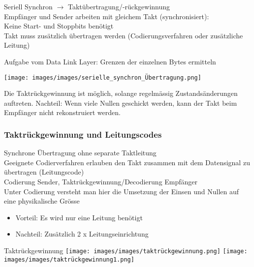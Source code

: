 \begin{definition}{Seriell Synchron} $\rightarrow$ Taktübertragung/-rückgewinnung \\
    Empfänger und Sender arbeiten mit gleichem Takt (synchronisiert): \\
    Keine Start- und Stoppbits benötigt\\
    Takt muss zusätzlich übertragen werden (Codierungsverfahren oder zusätzliche Leitung)
    
    \vspace{1mm}

    {\small Aufgabe vom Data Link Layer: Grenzen der einzelnen Bytes ermitteln}

    \texttt{[image: images/images/serielle\_synchron\_Übertragung.png]}
    
    Die Taktrückgewinnung ist möglich, solange regelmässig Zustandsänderungen auftreten. Nachteil: 
    Wenn viele Nullen geschickt werden, kann der Takt beim Empfänger nicht rekonstruiert werden. 
\end{definition}






\subsubsection{Taktrückgewinnung und Leitungscodes}

\begin{definition}{Synchrone Übertragung ohne separate Taktleitung}\\
    Geeignete Codierverfahren erlauben den Takt zusammen mit dem Datensignal zu übertragen (Leitungscode)\\
    Codierung Sender, Taktrückgewinnung/Decodierung Empfänger\\
    Unter Codierung versteht man hier die Umsetzung der Einsen und Nullen auf eine physikalische Grösse
    \begin{itemize}
        \item Vorteil: Es wird nur eine Leitung benötigt
        \item Nachteil: Zusätzlich 2 x Leitungseinrichtung
    \end{itemize}
\end{definition}

\begin{concept}{Taktrückgewinnung}
    \center
    \texttt{[image: images/images/taktrückgewinnung.png]}
    \center
    \texttt{[image: images/images/taktrückgewinnung1.png]}
\end{concept}

